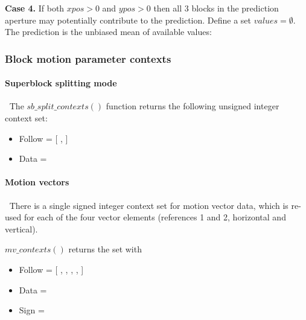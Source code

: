 {\bf Case 4.} If both $xpos>0$ and $ypos>0$ then all 3 blocks in the prediction aperture may potentially
contribute to the prediction. Define a set $values=\emptyset$. The prediction is the 
unbiased mean of available values:

\begin{pseudo*}
    \bsIF{\BlockData[ypos][xpos-1][\RMode]==\Intra}
    \bsEND
    \bsIF{\BlockData[ypos-1][xpos][\RMode]==\Intra}
    \bsEND
    \bsIF{\BlockData[ypos-1][xpos-1][\RMode]==\Intra}
    \bsEND

    \bsELSE
    \bsEND
\bsEND
\end{pseudo*}


\subsubsection{Block motion parameter contexts}

\paragraph{Superblock splitting mode}
$\ $\newline
The $sb\_split\_contexts()$ function returns the following unsigned integer context set:

\begin{itemize}
\item Follow = [ \SBSplitFollowOne, \SBSplitFollowTwo ]
\item Data = \SBSplitData
\end{itemize}

\paragraph{Motion vectors}
\label{mvcontexts}
$\ $\newline
There is a single signed integer context set for motion vector data, which is re-used for each of the four vector elements
(references 1 and 2, horizontal and vertical).

$mv\_contexts()$ returns the set with
\begin{itemize}
\item Follow = [ \VectorFollowOne, \VectorFollowTwo, \VectorFollowThree, \VectorFollowFour, \VectorFollowFivePlus ]
\item Data = \VectorData
\item Sign = \VectorSign
\end{itemize}

